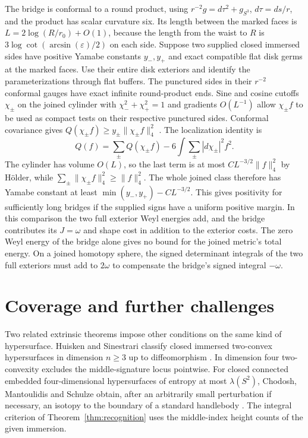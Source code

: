 \documentclass[11pt,letterpaper]{article}
\numberwithin{equation}{section}
\begin{document}
The bridge is conformal to a round product, using
\(r^{-2}g=d\tau^2+g_{S^3}\), \(d\tau=ds/r\), and the
product has scalar curvature six. Its length between the
marked faces is \(L=2\log(R/r_0)+O(1)\), because the length
from the waist to \(R\) is
\(3\log\cot(\arcsin(\varepsilon)/2)\) on each side.
Suppose two supplied closed immersed sides have
positive Yamabe constants \(y_-,y_+\) and exact compatible
flat disk germs at the marked faces. Use their entire
disk exteriors and identify the parameterizations
through flat buffers. The punctured sides in their
\(r^{-2}\) conformal gauges have exact infinite round-product
ends. Sine and cosine cutoffs \(\chi_\pm\) on the joined
cylinder with \(\chi_-^2+\chi_+^2=1\) and gradients
\(O(L^{-1})\) allow \(\chi_\pm f\) to be used as compact
tests on their respective punctured sides. Conformal
covariance gives \(Q(\chi_\pm f)\ge y_\pm\|\chi_\pm f\|_4^2\)
\cite[(2.7)]{LeeParker1987Yamabe}. The localization identity is
\[
 Q(f)=\sum_\pm Q(\chi_\pm f)-
                       6\int\sum_\pm |d\chi_\pm|^2 f^2 .
\]
The cylinder has volume \(O(L)\), so the last term is at
most \(C L^{-3/2}\|f\|_4^2\) by H\"older, while
\(\sum_\pm\|\chi_\pm f\|_4^2\ge\|f\|_4^2\).
The whole joined class therefore has Yamabe constant
at least \(\min(y_-,y_+)-CL^{-3/2}\). This gives positivity
for sufficiently long bridges if the supplied signs have
a uniform positive margin. In this comparison the two
full exterior Weyl energies add, and the bridge contributes
its \(J=\omega\) and shape cost in addition to the exterior
costs. The zero Weyl energy of the bridge alone gives no
bound for the joined metric's total energy. On a joined
homotopy sphere, the signed determinant integrals of the
two full exteriors must add to \(2\omega\) to compensate the
bridge's signed integral \(-\omega\).

\section{Coverage and further challenges}

Two related extrinsic theorems impose other conditions on the same
kind of hypersurface. Huisken and Sinestrari classify closed immersed
two-convex hypersurfaces in dimension \(n\ge3\) up to diffeomorphism
\cite[Corollary 1.2]{HuiskenSinestrari2009}. In dimension four
two-convexity excludes the middle-signature locus pointwise. For
closed connected embedded four-dimensional hypersurfaces of entropy
at most \(\lambda(S^2)\), Chodosh, Mantoulidis and Schulze obtain,
after an arbitrarily small perturbation if necessary, an isotopy to
the boundary of a standard handlebody
\cite[Corollary 1.5(b)]{ChodoshMantoulidisSchulze2024LowEntropy}.
The integral criterion of Theorem~\ref{thm:recognition} uses the
middle-index height counts of the given immersion.
\end{document}
